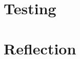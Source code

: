 \documentclass[11pt]{article}
\begin{document}

\section{Testing}%


\section{Reflection}





\end{document}
